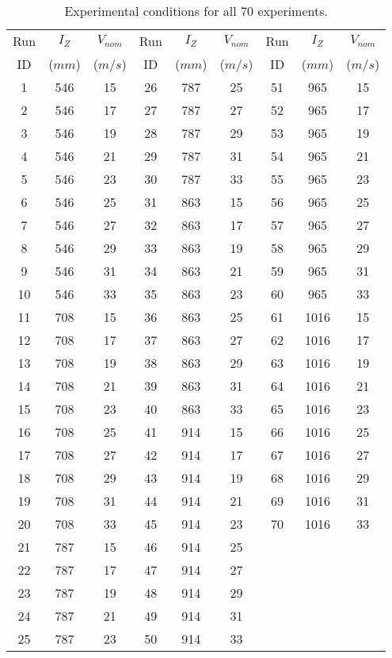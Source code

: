 \begin{table}[H]
\begin{center}
\begin{tabular}{|ccc||ccc||ccc|}
	\hline
	Run & $I_Z$  & $V_{nom}$ & Run & $I_Z$  & $V_{nom}$ & Run & $I_Z$  & $V_{nom}$\\
	ID & ($mm$) & ($m/s$) & ID & ($mm$) & ($m/s$) & ID & ($mm$) & ($m/s$)\\
	\hline
	1 & 546 & 15 & 26 & 787 & 25 & 51 & 965 & 15\\
	2 & 546 & 17 & 27 & 787 & 27 & 52 & 965 & 17\\
	3 & 546 & 19 & 28 & 787 & 29 & 53 & 965 & 19\\
	4 & 546 & 21 & 29 & 787 & 31 & 54 & 965 & 21\\
	5 & 546 & 23 & 30 & 787 & 33 & 55 & 965 & 23\\
	6 & 546 & 25 & 31 & 863 & 15 & 56 & 965 & 25\\
	7 & 546 & 27 & 32 & 863 & 17 & 57 & 965 & 27\\
	8 & 546 & 29 & 33 & 863 & 19 & 58 & 965 & 29\\
	9 & 546 & 31 & 34 & 863 & 21 & 59 & 965 & 31\\
	10 & 546 & 33 & 35 & 863 & 23 & 60 & 965 & 33\\
	11 & 708 & 15 & 36 & 863 & 25 & 61 & 1016 & 15\\
	12 & 708 & 17 & 37 & 863 & 27 & 62 & 1016 & 17\\
	13 & 708 & 19 & 38 & 863 & 29 & 63 & 1016 & 19\\
	14 & 708 & 21 & 39 & 863 & 31 & 64 & 1016 & 21\\
	15 & 708 & 23 & 40 & 863 & 33 & 65 & 1016 & 23\\
	16 & 708 & 25 & 41 & 914 & 15 & 66 & 1016 & 25\\
	17 & 708 & 27 & 42 & 914 & 17 & 67 & 1016 & 27\\
	18 & 708 & 29 & 43 & 914 & 19 & 68 & 1016 & 29\\
	19 & 708 & 31 & 44 & 914 & 21 & 69 & 1016 & 31\\
	20 & 708 & 33 & 45 & 914 & 23 & 70 & 1016 & 33\\
	21 & 787 & 15 & 46 & 914 & 25 &   &   &  \\
	22 & 787 & 17 & 47 & 914 & 27 &   &   &  \\
	23 & 787 & 19 & 48 & 914 & 29 &   &   &  \\
	24 & 787 & 21 & 49 & 914 & 31 &   &   &  \\
	25 & 787 & 23 & 50 & 914 & 33 &   &   &  \\
	\hline
\end{tabular}
\caption{Experimental conditions for all 70 experiments.}
\label{table:test_matrix_table}
\end{center}
\end{table}
